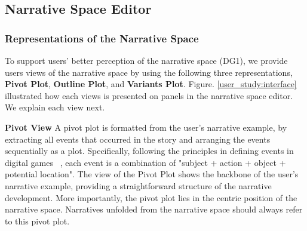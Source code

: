 
\subsection{Narrative Space Editor}

\subsubsection{Representations of the Narrative Space}







To support users' better perception of the narrative space (DG1), we provide users views of the narrative space by using the following three representations, \textbf{Pivot Plot}, \textbf{Outline Plot}, and \textbf{Variants Plot}. Figure. \ref{user_study:interface} illustrated how each views is presented on panels in the narrative space editor. We explain each view next.   


\noindent\textbf{Pivot View} A pivot plot is formatted from the user's narrative example, by extracting all events that occurred in the story and arranging the events sequentially as a plot. Specifically, following the principles in defining events in digital games ~\cite{gould2011narrative,castellan2017games},  each event is a combination of "subject + action + object + potential location". The view of the Pivot Plot shows the backbone of the user's narrative example, providing a straightforward structure of the narrative development. More importantly, the pivot plot lies in the centric position of the narrative space. Narratives unfolded from the narrative space should always refer to this pivot plot. 




